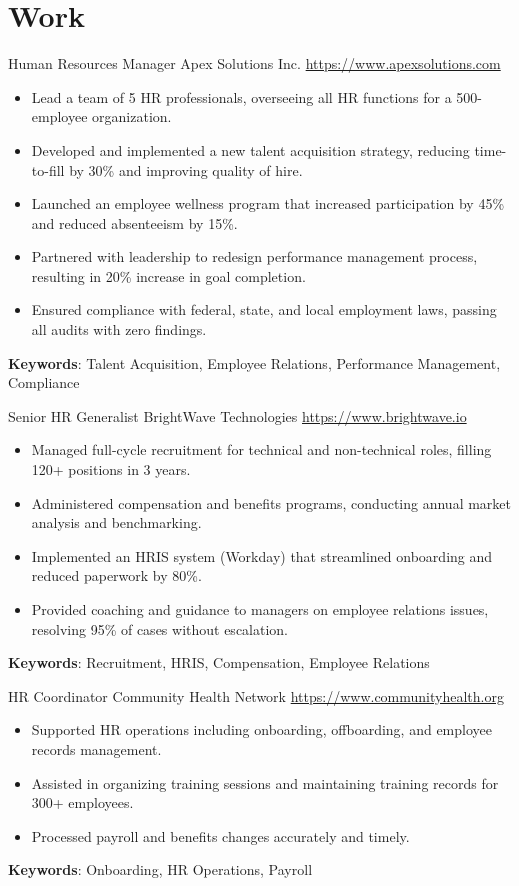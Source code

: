 \documentclass[a4paper, serif, 10pt]{moderncv}
\begin{document}
\section{Work}

        {Human Resources Manager}
        {Apex Solutions Inc.}
        {\url{https://www.apexsolutions.com}}
        {}
        {\begin{itemize}
\item Lead a team of 5 HR professionals, overseeing all HR functions for a 500-employee organization.
\item Developed and implemented a new talent acquisition strategy, reducing time-to-fill by 30\% and improving quality of hire.
\item Launched an employee wellness program that increased participation by 45\% and reduced absenteeism by 15\%.
\item Partnered with leadership to redesign performance management process, resulting in 20\% increase in goal completion.
\item Ensured compliance with federal, state, and local employment laws, passing all audits with zero findings.
\end{itemize}
\textbf{Keywords}: Talent Acquisition, Employee Relations, Performance Management, Compliance}

        {Senior HR Generalist}
        {BrightWave Technologies}
        {\url{https://www.brightwave.io}}
        {}
        {\begin{itemize}
\item Managed full-cycle recruitment for technical and non-technical roles, filling 120+ positions in 3 years.
\item Administered compensation and benefits programs, conducting annual market analysis and benchmarking.
\item Implemented an HRIS system (Workday) that streamlined onboarding and reduced paperwork by 80\%.
\item Provided coaching and guidance to managers on employee relations issues, resolving 95\% of cases without escalation.
\end{itemize}
\textbf{Keywords}: Recruitment, HRIS, Compensation, Employee Relations}

        {HR Coordinator}
        {Community Health Network}
        {\url{https://www.communityhealth.org}}
        {}
        {\begin{itemize}
\item Supported HR operations including onboarding, offboarding, and employee records management.
\item Assisted in organizing training sessions and maintaining training records for 300+ employees.
\item Processed payroll and benefits changes accurately and timely.
\end{itemize}
\textbf{Keywords}: Onboarding, HR Operations, Payroll}
\end{document}
